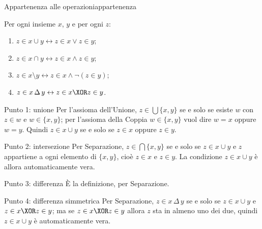 \begin{concetto}
\begin{Proposizione}{Appartenenza alle operazioni}{appartenenza}
    \begin{prerequisiti}
    \end{prerequisiti}
    Per ogni insieme $x$, $y$ e per ogni $z$:
    \begin{enumerate}
        \item $z \in x \cup y \leftrightarrow z \in x \vee z \in y$;
        \item $z \in x \cap y \leftrightarrow z \in x \wedge z \in y$;
        \item $z \in x \setminus y \leftrightarrow z \in x \wedge \neg(z \in y)$;
        \item $z \in x \,\Delta\, y \leftrightarrow z \in x \XOR z \in y$.
    \end{enumerate}
\end{Proposizione}
\begin{dimostrazione}
    \begin{caso}{Punto 1: unione}
        Per l'assioma dell'Unione, $z \in \bigcup\{x, y\}$ se e solo se esiste $w$ con $z \in w$ e $w \in \{x, y\}$;
        per l'assioma della Coppia $w \in \{x,y\}$ vuol dire $w = x$ oppure $w = y$. Quindi $z \in x \cup y$ se e solo se
        $z \in x$ oppure $z \in y$.
    \end{caso}
    \begin{caso}{Punto 2: intersezione}
        Per Separazione, $z \in \bigcap\{x, y\}$ se e solo se $z \in x \cup y$ e $z$ appartiene a ogni elemento di
        $\{x, y\}$, cioè $z \in x$ e $z \in y$. La condizione $z \in x \cup y$ è allora automaticamente vera.
    \end{caso}
    \begin{caso}{Punto 3: differenza}
        È la definizione, per Separazione.
    \end{caso}
    \begin{caso}{Punto 4: differenza simmetrica}
        Per Separazione, $z \in x \,\Delta\, y$ se e solo se $z \in x \cup y$ e $z \in x \XOR z \in y$; ma se
        $z \in x \XOR z \in y$ allora $z$ sta in almeno uno dei due, quindi $z \in x \cup y$ è automaticamente vera.
    \end{caso}
\end{dimostrazione}
\end{concetto}


